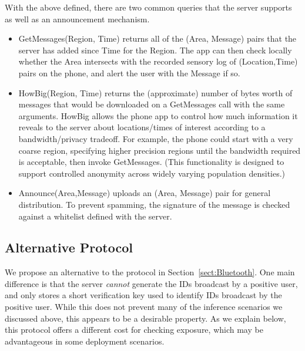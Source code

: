 With the above defined, there are two common queries that the server supports as well as an announcement mechanism.
\begin{itemize}
    \item GetMessages(Region, Time) returns all of the (Area, Message) pairs that the server has added since Time for the Region. The app can then check locally whether the Area intersects with the recorded sensory log of (Location,Time) pairs on the phone, and alert the user with the Message if so.   
    \item HowBig(Region, Time) returns the (approximate) number of bytes worth of messages that would be downloaded on a GetMessages call with the same arguments.  HowBig allows the phone app to control how much information it reveals to the server about locations/times of interest according to a bandwidth/privacy tradeoff.  For example, the phone could start with a very coarse region, specifying higher precision regions until the bandwidth required is acceptable, then invoke GetMessages.  (This functionality is designed to support controlled anonymity across widely varying population densities.)
    \item Announce(Area,Message) uploads an (Area, Message) pair for general distribution.  To prevent spamming, the signature of the message is checked against a whitelist defined with the server. 
\end{itemize}

\newcommand{\skey}{\mathrm{sk}}
\newcommand{\vkey}{\mathrm{vk}}
\newcommand{\Kg}{\mathsf{Kg}}
\newcommand{\Sign}{\mathsf{Sign}}
\newcommand{\Vrfy}{\mathsf{Vrfy}}
\newcommand{\gps}{\mathrm{coord}}

\subsection{Alternative Protocol}\label{sect:alternative}

We propose an alternative to the protocol in Section~\ref{sect:Bluetooth}. One main difference is that the server {\em cannot} generate the IDs broadcast by a positive user, and only stores a short verification key used to identify IDs broadcast by the positive user. While this does not prevent many of the inference scenarios we discussed above, this appears to be a desirable property. As we explain below, this protocol offers a different cost for checking exposure, which may be advantageous in some deployment scenarios.


